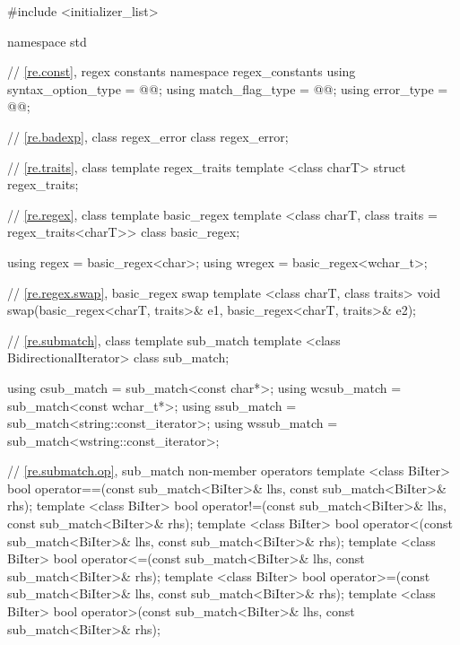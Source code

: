%
%
%
%
\begin{codeblock}
#include <initializer_list>

namespace std {
  // \ref{re.const}, regex constants
  namespace regex_constants {
    using syntax_option_type = @@;
    using match_flag_type = @@;
    using error_type = @@;
  }

  // \ref{re.badexp}, class regex_error
  class regex_error;

  // \ref{re.traits}, class template regex_traits
  template <class charT> struct regex_traits;

  // \ref{re.regex}, class template basic_regex
  template <class charT, class traits = regex_traits<charT>> class basic_regex;

  using regex  = basic_regex<char>;
  using wregex = basic_regex<wchar_t>;

  // \ref{re.regex.swap}, basic_regex swap
  template <class charT, class traits>
    void swap(basic_regex<charT, traits>& e1, basic_regex<charT, traits>& e2);

  // \ref{re.submatch}, class template sub_match
  template <class BidirectionalIterator>
    class sub_match;

  using csub_match  = sub_match<const char*>;
  using wcsub_match = sub_match<const wchar_t*>;
  using ssub_match  = sub_match<string::const_iterator>;
  using wssub_match = sub_match<wstring::const_iterator>;

  // \ref{re.submatch.op}, sub_match non-member operators
  template <class BiIter>
    bool operator==(const sub_match<BiIter>& lhs, const sub_match<BiIter>& rhs);
  template <class BiIter>
    bool operator!=(const sub_match<BiIter>& lhs, const sub_match<BiIter>& rhs);
  template <class BiIter>
    bool operator<(const sub_match<BiIter>& lhs, const sub_match<BiIter>& rhs);
  template <class BiIter>
    bool operator<=(const sub_match<BiIter>& lhs, const sub_match<BiIter>& rhs);
  template <class BiIter>
    bool operator>=(const sub_match<BiIter>& lhs, const sub_match<BiIter>& rhs);
  template <class BiIter>
    bool operator>(const sub_match<BiIter>& lhs, const sub_match<BiIter>& rhs);

}
\end{codeblock}
